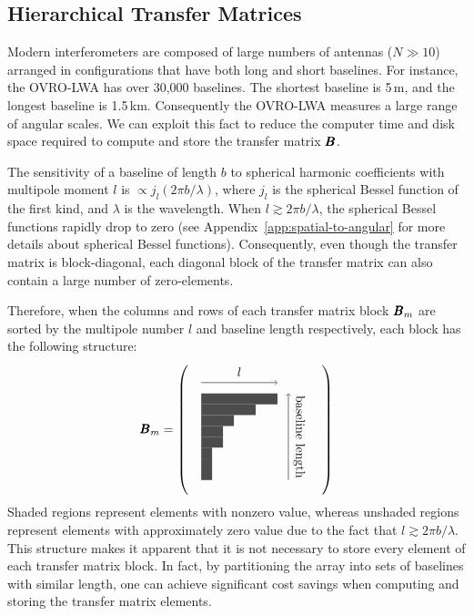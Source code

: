 \begin{bibunit}
\subsection{Hierarchical Transfer Matrices}

Modern interferometers are composed of large numbers of antennas ($N \gg 10$) arranged in
configurations that have both long and short baselines. For instance, the OVRO-LWA has over 30,000
baselines. The shortest baseline is 5\,m, and the longest baseline is 1.5\,km. Consequently the
OVRO-LWA measures a large range of angular scales. We can exploit this fact to reduce the computer
time and disk space required to compute and store the transfer matrix $\pmb B$.

The sensitivity of a baseline of length $b$ to spherical harmonic coefficients with multipole moment
$l$ is $\propto j_l(2\pi b/\lambda)$, where $j_l$ is the spherical Bessel function of the first
kind, and $\lambda$ is the wavelength. When $l \gtrsim 2\pi b/\lambda$, the spherical Bessel
functions rapidly drop to zero (see Appendix~\ref{app:spatial-to-angular} for more details about
spherical Bessel functions). Consequently, even though the transfer matrix is block-diagonal, each
diagonal block of the transfer matrix can also contain a large number of zero-elements.

Therefore, when the columns and rows of each transfer matrix block $\pmb B_m$ are sorted by the
multipole number $l$ and baseline length respectively, each block has the following structure:
\begin{equation}
    \b B_m = \left(
        \quad
        \begin{tikzpicture}[baseline=+13mm, scale=0.3]
            \draw [->] (0, 9) -- (7, 9);
            \node at (3.5, 10) {$l$};
            \draw [->] (8, 0) -- (8, 8);
            \node [rotate=270] at (9, 4) {baseline length};
            \fill [fill=black!70] (0, 0) rectangle (1, 1);
            \fill [fill=black!70] (0, 1) rectangle (1, 2);
            \fill [fill=black!70] (0, 2) rectangle (1, 3);
            \fill [fill=black!70] (0, 3) rectangle (2, 4);
            \fill [fill=black!70] (0, 4) rectangle (2, 5);
            \fill [fill=black!70] (0, 5) rectangle (3, 6);
            \fill [fill=black!70] (0, 6) rectangle (5, 7);
            \fill [fill=black!70] (0, 7) rectangle (7, 8);
        \end{tikzpicture}
        \quad
    \right)
\end{equation}
Shaded regions represent elements with nonzero value, whereas unshaded regions represent elements
with approximately zero value due to the fact that $l \gtrsim 2\pi b/\lambda$. This structure makes
it apparent that it is not necessary to store every element of each transfer matrix block. In fact,
by partitioning the array into sets of baselines with similar length, one can achieve significant
cost savings when computing and storing the transfer matrix elements.


\end{bibunit}
